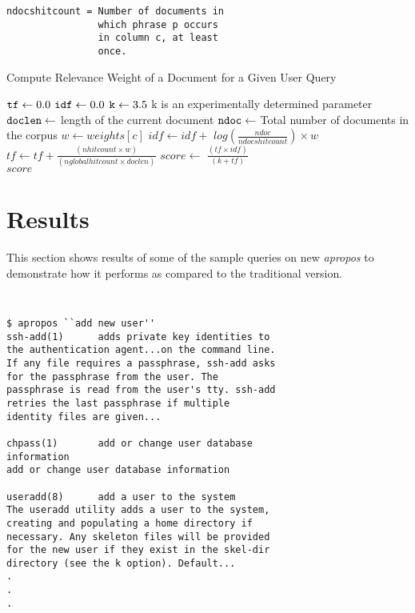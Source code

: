 \documentclass[letterpaper,twocolumn,10pt]{article}
\begin{document}
\begin{description}
{\begin{lstlisting}
ndocshitcount = Number of documents in
                which phrase p occurs
                in column c, at least
                once.
\end{lstlisting}
}
\begin{algorithm}
\caption{Compute Relevance Weight of a Document for a Given User Query}
\label{alg1}
\begin{algorithmic}[1]
\State ${\tt tf} \gets 0.0$
\State ${\tt idf} \gets 0.0$
\State ${\tt k} \gets 3.5$
\Comment 
{k is an experimentally determined parameter}
\State ${\tt doclen} \gets $ length of the current document
\State ${\tt ndoc} \gets $ Total number of documents in the corpus
\State $w \gets weights[c] $
\State $idf \gets idf + $ $log(\frac{ndoc}{ndocshitcount})\times w $
\State $tf \gets tf + \frac{(nhitcount \times w)}{(nglobalhitcount \times doclen)}$
\EndFor
\EndFor
\State $score \gets $ $\frac{(tf \times idf)}{(k + tf)}$ \\
\Return $score$
\end{algorithmic}
\end{algorithm}
\end{description}

\section{Results}
This section shows results of some of the sample queries on new \textit{apropos}
to demonstrate how it performs as compared to the traditional version.
 \\

{\tt \small
{}
\begin{lstlisting}
$ apropos ``add new user''
ssh-add(1)      adds private key identities to
the authentication agent...on the command line.
If any file requires a passphrase, ssh-add asks
for the passphrase from the user. The
passphrase is read from the user's tty. ssh-add
retries the last passphrase if multiple
identity files are given...

chpass(1)       add or change user database
information
add or change user database information

useradd(8)      add a user to the system
The useradd utility adds a user to the system,
creating and populating a home directory if
necessary. Any skeleton files will be provided
for the new user if they exist in the skel-dir
directory (see the k option). Default...
.
.
.
\end{lstlisting}
}
\end{document}

